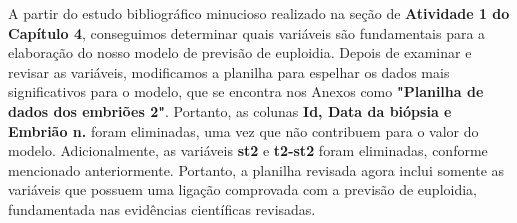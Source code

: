 A partir do estudo bibliográfico minucioso realizado na seção de \textbf{Atividade 1 do Capítulo 4}, conseguimos determinar quais variáveis são fundamentais para a elaboração do nosso modelo de previsão de euploidia. Depois de examinar e revisar as variáveis, modificamos a planilha para espelhar os dados mais significativos para o modelo, que se encontra nos Anexos como \textbf{"Planilha de dados dos embriões 2"}. Portanto, as colunas \textbf{Id, Data da biópsia e Embrião n.} foram eliminadas, uma vez que não contribuem para o valor do modelo. Adicionalmente, as variáveis \textbf{st2} e \textbf{t2-st2} foram eliminadas, conforme mencionado anteriormente. Portanto, a planilha revisada agora inclui somente as variáveis que possuem uma ligação comprovada com a previsão de euploidia, fundamentada nas evidências científicas revisadas.

